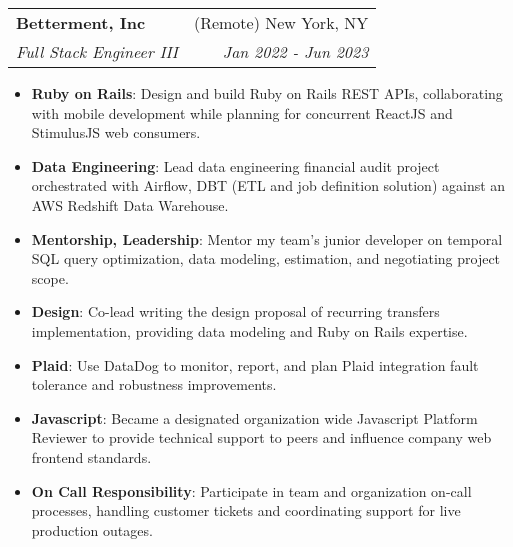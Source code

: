 \documentclass[letterpaper,11pt]{article}
\makeatletter
\newcommand{\resumeItem}[2]{
  \item\small{
    \textbf{#1}{: #2 \vspace{-2pt}}
  }
}
\newcommand{\resumeSubheading}[4]{
  \vspace{-1pt}\item
    \begin{tabular*}{0.97\textwidth}{l@{\extracolsep{\fill}}r}
      \textbf{#1} & #2 \\
      \textit{\small#3} & \textit{\small #4} \\
    \end{tabular*}\vspace{-5pt}
}
\newcommand{\resumeItemListStart}{\begin{itemize}}
\newcommand{\resumeItemListEnd}{\end{itemize}\vspace{-5pt}}
\makeatother
\begin{document}
    \resumeSubheading
      {Betterment, Inc}{(Remote) New York, NY}
      {Full Stack Engineer III}{Jan 2022 - Jun 2023}
      \resumeItemListStart
        \resumeItem{Ruby on Rails}
          {Design and build Ruby on Rails REST APIs, collaborating with mobile development while planning for concurrent ReactJS and StimulusJS web consumers.}
        \resumeItem{Data Engineering}
          {Lead data engineering financial audit project orchestrated with Airflow, DBT (ETL and job definition solution) against an AWS Redshift Data Warehouse.}
        \resumeItem{Mentorship, Leadership}
          {Mentor my team's junior developer on temporal SQL query optimization, data modeling, estimation, and negotiating project scope.}
        \resumeItem{Design}
          {Co-lead writing the design proposal of recurring transfers implementation, providing data modeling and Ruby on Rails expertise.}
        \resumeItem{Plaid}
          {Use DataDog to monitor, report, and plan Plaid integration fault tolerance and robustness improvements.}
        \resumeItem{Javascript}
          {Became a designated organization wide Javascript Platform Reviewer to provide technical support to peers and influence company web frontend standards.}
        \resumeItem{On Call Responsibility}
          {Participate in team and organization on-call processes, handling customer tickets and coordinating support for live production outages.}
      \resumeItemListEnd
\end{document}
